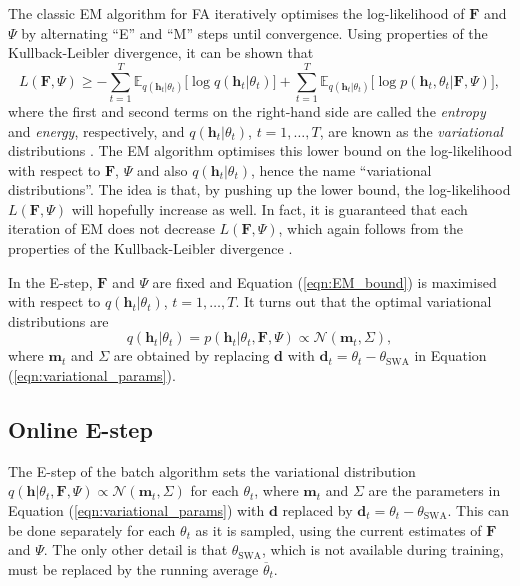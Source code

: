\documentclass[msc,deptreport.inf]{infthesis} %
\newcommand{\matr}[1]{\mathbf{#1}}
\newcommand{\E}{\mathbb E}
\begin{document}
The classic EM algorithm for FA iteratively optimises the log-likelihood of $\matr{F}$ and $\Psi$ by alternating ``E'' and ``M'' steps until convergence. Using properties of the Kullback-Leibler divergence, it can be shown that 
\begin{equation}\label{eqn:EM_bound}
	L(\matr{F}, \Psi) \geq 
	- \sum_{t=1}^T \E_{q(\matr{h}_t | \theta_t)} \big[\log q(\matr{h}_t | \theta_t)\big]
	+ \sum_{t=1}^T \E_{q(\matr{h}_t | \theta_t)} \big[\log p(\matr{h}_t, \theta_t | \matr{F}, \Psi)\big],
\end{equation}
where the first and second terms on the right-hand side are called the \emph{entropy} and \emph{energy}, respectively, and $q(\matr{h}_t | \theta_t)$, $t=1,\dots,T$, are known as the \emph{variational} distributions \cite{barber2007}. The EM algorithm optimises this lower bound on the log-likelihood with respect to $\matr{F}$, $\Psi$ and also $q(\matr{h}_t | \theta_t)$, hence the name ``variational distributions''. The idea is that, by pushing up the lower bound, the log-likelihood $L(\matr{F}, \Psi)$ will hopefully increase as well. In fact, it is guaranteed that each iteration of EM does not decrease $L(\matr{F}, \Psi)$, which again follows from the properties of the Kullback-Leibler divergence \cite{barber2007}.

In the E-step, $\matr{F}$ and $\Psi$ are fixed and Equation (\ref{eqn:EM_bound}) is maximised with respect to $q(\matr{h}_t | \theta_t)$, $t=1,\dots,T$. It turns out that the optimal variational distributions are 
\begin{equation}
	q(\matr{h}_t | \theta_t) = p(\matr{h}_t | \theta_t, \matr{F}, \Psi)  \propto \mathcal{N}(\matr{m}_t, \Sigma), 
\end{equation}
where $\matr{m}_t$ and $\Sigma$ are obtained by replacing $\matr{d}$ with $\matr{d}_t = \theta_t - \theta_{\text{SWA}}$ in Equation (\ref{eqn:variational_params}). 



\subsection{Online E-step}

The E-step of the batch algorithm sets the variational distribution $q(\matr{h} | \theta_t, \matr{F}, \Psi) \propto \mathcal{N}(\matr{m}_t, \Sigma)$ for each $\theta_t$, where $\matr{m}_t$ and $\Sigma$ are the parameters in Equation (\ref{eqn:variational_params}) with $\matr{d}$ replaced by $\matr{d}_t = \theta_t - \theta_{\text{SWA}}$. This can be done separately for each $\theta_t$ as it is sampled, using the current estimates of $\matr{F}$ and $\Psi$. The only other detail is that $\theta_{\text{SWA}}$, which is not available during training, must be replaced by the running average $\overline{\theta}_t$.
\end{document}
